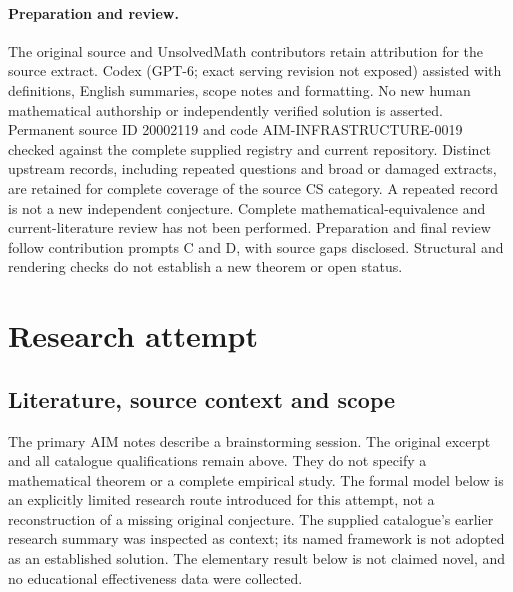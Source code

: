 \documentclass[11pt]{article}
\begin{document}
\paragraph{Preparation and review.}
The original source and UnsolvedMath contributors retain attribution for the source extract. Codex (GPT-6; exact serving revision not exposed) assisted with definitions, English summaries, scope notes and formatting. No new human mathematical authorship or independently verified solution is asserted. Permanent source ID 20002119 and code AIM-INFRASTRUCTURE-0019 checked against the complete supplied registry and current repository. Distinct upstream records, including repeated questions and broad or damaged extracts, are retained for complete coverage of the source CS category. A repeated record is not a new independent conjecture. Complete mathematical-equivalence and current-literature review has not been performed. Preparation and final review follow contribution prompts C and D, with source gaps disclosed. Structural and rendering checks do not establish a new theorem or open status.
\label{end:20002119}

\section{Research attempt}
\subsection{Literature, source context and scope}
The primary AIM notes describe a brainstorming session. The original excerpt and all catalogue qualifications remain above. They do not specify a mathematical theorem or a complete empirical study. The formal model below is an explicitly limited research route introduced for this attempt, not a reconstruction of a missing original conjecture. The supplied catalogue's earlier research summary was inspected as context; its named framework is not adopted as an established solution. The elementary result below is not claimed novel, and no educational effectiveness data were collected.
\end{document}
